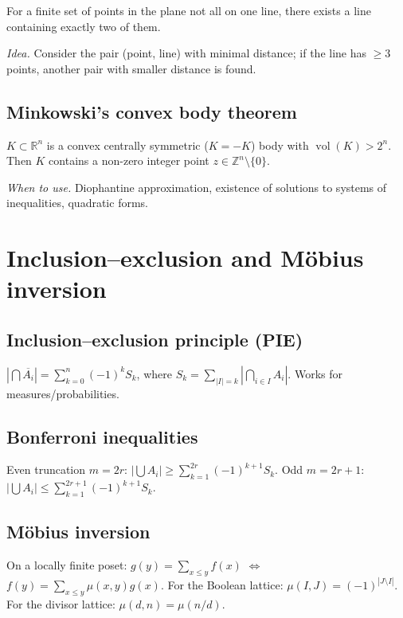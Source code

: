 For a finite set of points in the plane not all on one line, there exists a line containing exactly two of them.

\textit{Idea.} Consider the pair (point, line) with minimal distance; if the line has $\ge3$ points, another pair with smaller distance is found.

\subsection{Minkowski's convex body theorem}
\label{subsec:minkowski-convex}

$K\subset\mathbb{R}^n$ is a convex centrally symmetric ($K=-K$) body with $\operatorname{vol}(K)>2^n$. Then $K$ contains a non-zero integer point $z\in\mathbb{Z}^n\setminus\{0\}$.

\textit{When to use.} Diophantine approximation, existence of solutions to systems of inequalities, quadratic forms.

\medskip

\section{Inclusion--exclusion and M\"obius inversion}
\label{sec:inclusion-exclusion}

\subsection{Inclusion--exclusion principle (PIE)}
\label{subsec:pie}

$|\bigcap\overline{A_i}|=\sum_{k=0}^n(-1)^k S_k$, where $S_k=\sum_{|I|=k}|\bigcap_{i\in I}A_i|$. Works for measures/probabilities.

\subsection{Bonferroni inequalities}
\label{subsec:bonferroni}

Even truncation $m=2r$: $|\bigcup A_i|\ge\sum_{k=1}^{2r}(-1)^{k+1}S_k$. Odd $m=2r+1$: $|\bigcup A_i|\le\sum_{k=1}^{2r+1}(-1)^{k+1}S_k$.

\subsection{M\"obius inversion}
\label{subsec:mobius-inversion}

On a locally finite poset: $g(y)=\sum_{x\le y}f(x)$ $\iff$ $f(y)=\sum_{x\le y}\mu(x,y)g(x)$. For the Boolean lattice: $\mu(I,J)=(-1)^{|J\setminus I|}$. For the divisor lattice: $\mu(d,n)=\mu(n/d)$.

